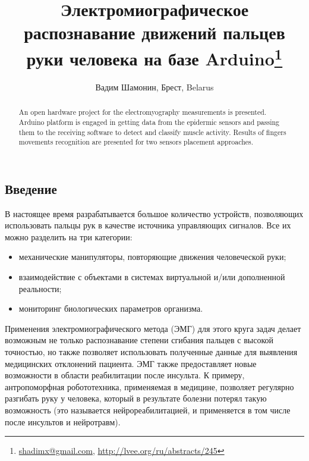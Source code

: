 \documentclass[10pt, a5paper]{article}
\begin{document}
\title{Электромиографическое распознавание движений пальцев руки человека на базе Arduino\footnote{\url{shadimx@gmail.com}, \url{http://lvee.org/ru/abstracts/245}}}
\author{Вадим Шамонин, Брест, Belarus}
\maketitle
\begin{abstract}
An open hardware project for the electromyography measurements is presented. Arduino platform is engaged in getting data from the epidermic sensors and passing them to the receiving software to detect and classify muscle activity. Results of fingers movements recognition are presented for two sensors placement approaches.
\end{abstract}
\subsection*{Введение}

В настоящее время разрабатывается большое количество устройств, позволяющих использовать пальцы рук в качестве источника управляющих сигналов. Все их можно разделить на три категории:

\begin{itemize}
  \item механические манипуляторы, повторяющие движения человеческой руки;
  \item взаимодействие с объектами в системах виртуальной и/или дополненной реальности;
  \item мониторинг биологических параметров организма.
\end{itemize}

Применения электромиографического метода (ЭМГ) для этого круга задач делает возможным не только распознавание степени сгибания пальцев с высокой точностью, но также позволяет использовать полученные данные для выявления медицинских отклонений пациента. ЭМГ также предоставляет новые возможности в области реабилитации после инсульта. К примеру, антропоморфная робототехника, применяемая в медицине, позволяет регулярно разгибать руку у человека, который в результате болезни потерял такую возможность (это называется нейрореабилитацией, и применяется в том числе после инсультов и нейротравм).
\end{document}
